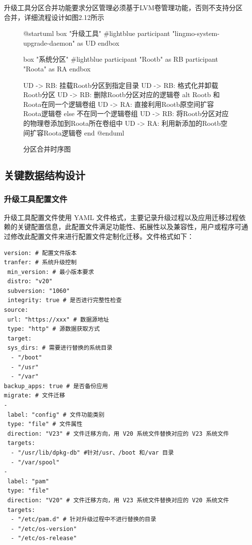 \documentclass{utart}
\begin{document}
升级工具分区合并功能要求分区管理必须基于LVM卷管理功能，否则不支持分区合并，详细流程设计如图2.12所示
\begin{figure}
    \centering
    \begin{plantuml}
        @startuml
        box "升级工具" #lightblue
        participant "lingmo-system-upgrade-daemon" as UD
        endbox

        box "系统分区" #lightblue
        participant "Rootb" as RB
        participant "Roota" as RA
        endbox

        UD -> RB: 挂载Rootb分区到指定目录
        UD -> RB: 格式化并卸载Rootb分区
        UD -> RB: 删除Rootb分区对应的逻辑卷
        alt Rootb 和 Roota在同一个逻辑卷组
        UD -> RA: 直接利用Rootb原空间扩容Roota逻辑卷
        else 不在同一个逻辑卷组
        UD -> RB: 将Rootb分区对应的物理卷添加到Roota所在卷组中
        UD -> RA: 利用新添加的Rootb空间扩容Roota逻辑卷
        end
        @enduml
    \end{plantuml}
    \caption{分区合并时序图}
    \label{fig:partition}
\end{figure}

\subsection{关键数据结构设计}

\subsubsection{升级工具配置文件}
升级工具配置文件使用 YAML 文件格式，主要记录升级过程以及应用迁移过程依赖的关键配置信息，此配置文件满足功能性、拓展性以及兼容性，用户或程序可通过修改此配置文件来进行配置文件定制化迁移。文件格式如下：

\begin{verbatim}
version: # 配置文件版本
tranfer: # 系统升级控制
 min_version: # 最小版本要求
 distro: "v20"
 subversion: "1060"
 integrity: true # 是否进行完整性检查
source:
 url: "https://xxx" # 数据源地址
 type: "http" # 源数据获取方式
 target:
 sys_dirs: # 需要进行替换的系统目录
  - "/boot"
  - "/usr"
  - "/var"
backup_apps: true # 是否备份应用
migrate: # 文件迁移
-
 label: "config" # 文件功能类别
 type: "file" # 文件属性
 direction: "V23" # 文件迁移方向，用 V20 系统文件替换对应的 V23 系统文件
 targets:
  - "/usr/lib/dpkg-db" #针对/usr、/boot 和/var 目录
  - "/var/spool"
-
 label: "pam"
 type: "file"
 direction: "V20" # 文件迁移方向，用 V23 系统文件替换对应的 V20 系统文件
 targets:
  - "/etc/pam.d" # 针对升级过程中不进行替换的目录
  - "/etc/os-version"
  - "/etc/os-release"
\end{verbatim}
\end{document}
